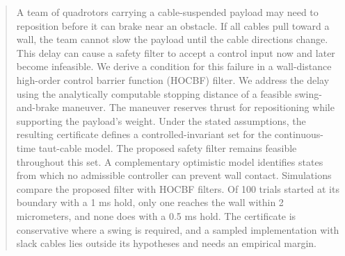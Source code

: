 \documentclass[letterpaper,10pt,conference]{ieeeconf}
\begin{document}
\begin{abstract}
A team of quadrotors carrying a cable-suspended payload may need to reposition before it can brake near an obstacle.  If all cables pull toward a wall, the team cannot slow the payload until the cable directions change.  This delay can cause a safety filter to accept a control input now and later become infeasible. We derive a condition for this failure in a wall-distance high-order control barrier function (HOCBF) filter.  We address the delay using the analytically computable stopping distance of a feasible swing-and-brake maneuver.  The maneuver reserves thrust for repositioning while supporting the payload’s weight.  Under the stated assumptions, the resulting certificate defines a controlled-invariant set for the continuous-time taut-cable model.  The proposed safety filter remains feasible throughout this set.  A complementary optimistic model identifies states from which no admissible controller can prevent wall contact.  Simulations compare the proposed filter with HOCBF filters. Of 100 trials started at its boundary with a 1 ms hold, only one reaches the wall within 2 micrometers, and none does with a 0.5 ms hold. The certificate is conservative where a swing is required, and a sampled implementation with slack cables lies outside its hypotheses and needs an empirical margin.

\end{abstract}

















\end{document}

